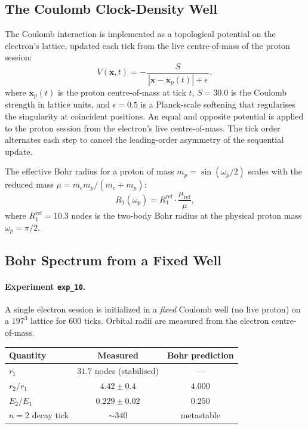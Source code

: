 \subsection{The Coulomb Clock-Density Well}
\label{subsec:coulomb_well}

The Coulomb interaction is implemented as a topological potential on
the electron's lattice, updated each tick from the live centre-of-mass
of the proton session:
\begin{equation}
    V(\mathbf{x}, t)
        = -\frac{S}{\,|\mathbf{x} - \mathbf{x}_p(t)| + \epsilon\,},
    \label{eq:coulomb_well}
\end{equation}
where $\mathbf{x}_p(t)$ is the proton centre-of-mass at tick $t$,
$S = 30.0$ is the Coulomb strength in lattice units, and $\epsilon = 0.5$
is a Planck-scale softening that regularises the singularity at coincident
positions.
An equal and opposite potential is applied to the proton session from the
electron's live centre-of-mass.
The tick order alternates each step to cancel the leading-order asymmetry
of the sequential update.

The effective Bohr radius for a proton of mass $m_p = \sin(\omega_p/2)$
scales with the reduced mass $\mu = m_e m_p / (m_e + m_p)$:
\begin{equation}
    R_1(\omega_p) = R_1^\text{ref} \cdot \frac{\mu_\text{ref}}{\mu},
    \label{eq:bohr_scaling}
\end{equation}
where $R_1^\text{ref} = 10.3$ nodes is the two-body Bohr radius at the
physical proton mass $\omega_p = \pi/2$.

\subsection{Bohr Spectrum from a Fixed Well}
\label{subsec:exp10}

\paragraph{Experiment \texttt{exp\_10}.}
A single electron session is initialized in a \emph{fixed} Coulomb well
(no live proton) on a $197^3$ lattice for 600 ticks.
Orbital radii are measured from the electron centre-of-mass.

\medskip
\begin{center}
\begin{tabular}{lcc}
\hline
Quantity & Measured & Bohr prediction \\
\hline
$r_1$               & $31.7$ nodes (stabilised)  & ---       \\
$r_2 / r_1$         & $4.42 \pm 0.4$             & $4.000$   \\
$E_2 / E_1$         & $0.229 \pm 0.02$           & $0.250$   \\
$n{=}2$ decay tick  & $\sim 340$                 & metastable \\
\hline
\end{tabular}
\end{center}
\medskip

